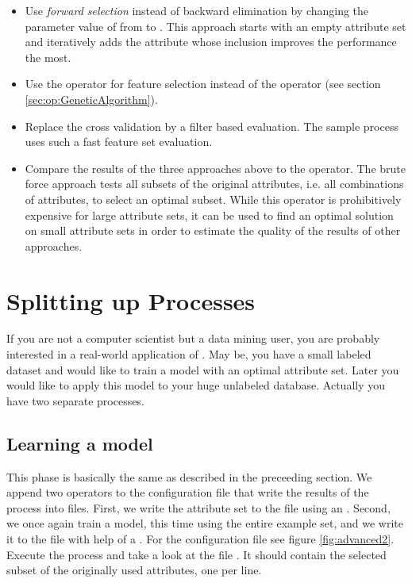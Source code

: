 \begin{itemize}
  \item Use {\em forward selection} instead of backward elimination by
    changing the parameter value of  from
     to .
    This approach starts with an empty attribute set and iteratively
    adds the attribute whose inclusion improves the performance the
    most.
  \item Use the  operator for feature selection
    instead of the  operator (see section
    \ref{sec:op:GeneticAlgorithm}).
  \item Replace the cross validation by a filter based evaluation. The sample
  process  uses such a fast feature
  set evaluation.
  \item Compare the results of the three approaches above to the 
     operator.
    The brute force approach tests all subsets of the original attributes,
    i.e. all combinations of attributes, to select an optimal subset.
    While this operator is prohibitively expensive for large attribute
    sets, it can be used to find an optimal solution on small attribute 
    sets in order to estimate the quality of the results of other
    approaches.
\end{itemize}





\section{Splitting up Processes}
If you are not a computer scientist but a data mining user, you are
probably interested in a real-world application of \rapidminer. 
   May be, you have a small labeled dataset and would like to train
a model with an optimal attribute set. 
   Later you would like to apply this model to your huge unlabeled 
database.
   Actually you have two separate processes.

\subsection{Learning a model}
This phase is basically the same as described in the preceeding section.
   We append two operators to the configuration file that write the results
of the process into files.
   First, we write the attribute set to the file 
 using an .
   Second, we once again train a model, this time using the entire example
set, and we write it to the file  with help of a
   .
   For the configuration file see figure \ref{fig:advanced2}. 
Execute the process and take a look at the file .
It should contain the selected subset of the originally used attributes, 
one per line.


